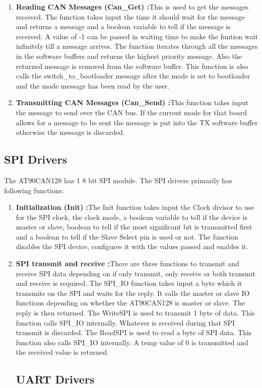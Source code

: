 \begin{enumerate}
\item \textbf{Reading CAN Messages (Can\_Get) :}This is used to get the messages received. The function takes input the time it should wait for the message and returns a message and a boolean variable to tell if the message is received. A value of -1 can be passed in waiting time to make the funtion wait infinitely till a message arrives. The function iterates through all the messages in the software buffers and returns the highest priority message. Also the returned message is removed from the software buffer. This function is also calls the switch\_to\_bootloader message after the mode is set to bootloader and the mode message has been read by the user.
\item \textbf{Transmitting CAN Messages (Can\_Send) :}This function takes input the message to send over the CAN bus. If the current mode for that board allows for a message to be sent the message is put into the TX software buffer otherwise the message is discarded.
\end{enumerate}

\subsection{SPI Drivers}
The AT90CAN128 has 1 8 bit SPI module. The SPI drivers primarily has following functions:
\begin{enumerate}
\item \textbf{Initialization (Init) :}The Init function takes input the Clock divisor to use for the SPI clock, the clock mode, a boolean variable to tell if the device is master or slave, boolean to tell if the most significant bit is transmitted first and a boolean to tell if the Slave Select pin is used or not. The function disables the SPI device, configures it with the values passed and enables it.
\item \textbf{SPI transmit and receive :}There are three functions to transmit and receive SPI data depending on if only transmit, only receive or both transmit and receive is required. 
The SPI\_IO function takes input a byte which it transmits on the SPI and waits for the reply. It calls the master or slave IO functions depending on whether the AT90CAN128 is master or slave. The reply is then returned. \newline
The WriteSPI is used to transmit 1 byte of data. This function calls SPI\_IO internally. Whatever is received during that SPI transmit is discarded. \newline
The ReadSPI is used to read a byte of SPI data. This function also calls SPI\_IO internally. A temp value of 0 is transmitted and the received value is returned.


\subsection{UART Drivers}


\end{enumerate}